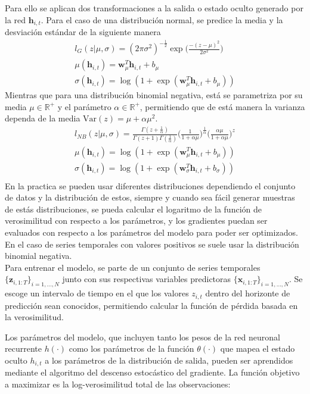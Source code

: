 \documentclass[12pt,letterpaper]{article}
\begin{document}
Para ello se aplican dos transformaciones a la salida o estado oculto generado por la red $\textbf{h}_{i,t}$. Para el caso de una distribución normal, se predice la media y la desviación estándar de la siguiente manera
\begin{gather}
    l_G(z|\mu, \sigma) = (2\pi \sigma^2)^{-\frac{1}{2}}\exp\bigg(\frac{-(z-\mu)^2}{2\sigma^2}\bigg)\\
    \mu( \textbf{h}_{i,t})= \textbf{w}_\mu^T\textbf{h}_{i,t}+b_\mu\\
    \sigma( \textbf{h}_{i,t})=\log(1+\exp(\textbf{w}_\mu^T\textbf{h}_{i,t}+b_\mu))
\end{gather}
Mientras que para una distribución binomial negativa, está se parametriza por su media $\mu\in\mathbb{R}^+$ y el parámetro $\alpha\in\mathbb{R}^+$, permitiendo que de está manera la varianza dependa de la media $\text{Var}(z)=\mu+\alpha\mu^2$.
\begin{gather}
    l_{NB}(z|\mu,\sigma) = \frac{\Gamma(z+\frac{1}{\alpha})}{\Gamma(z+1) \Gamma(\frac{1}{\alpha})} \bigg( \frac{1}{1+\alpha \mu}\bigg)^{\frac{1}{\alpha}}\bigg( \frac{\alpha \mu}{1+\alpha\mu}\bigg)^z\\
    \mu(\textbf{h}_{i,t})=\log(1+\exp(\textbf{w}_\mu^T\textbf{h}_{i,t}+b_\mu))\\
    \sigma(\textbf{h}_{i,t})=\log(1+\exp(\textbf{w}_\sigma^T\textbf{h}_{i,t}+b_\sigma))\\
\end{gather}
En la practica se pueden usar diferentes distribuciones dependiendo el conjunto de datos y la distribución de estos, siempre y cuando sea fácil generar muestras de estás distribuciones, se pueda calcular el logaritmo de la función de verosimilitud con respecto a los parámetros, y los gradientes puedan ser evaluados con respecto a los parámetros del modelo para poder ser optimizados. En el caso de series temporales con valores positivos se suele usar la distribución binomial negativa.\\

Para entrenar el modelo, se parte de un conjunto de series temporales $\{\textbf{z}_{i, 1:T}\}_{i=1,\dots,N}$ junto con sus respectivas variables predictoras $\{\textbf{x}_{i,1:T}\}_{i=1,\dots,N}$. Se escoge un intervalo de tiempo en el que los valores $z_{i,t}$ dentro del horizonte de predicción sean conocidos, permitiendo calcular la función de pérdida basada en la verosimilitud.

Los parámetros del modelo, que incluyen tanto los pesos de la red neuronal recurrente $h(\cdot)$ como los parámetros de la función $\theta(\cdot)$ que mapea el estado oculto $h_{i,t}$ a los parámetros de la distribución de salida, pueden ser aprendidos mediante el algoritmo del descenso estocástico del gradiente. La función objetivo a maximizar es la log-verosimilitud total de las observaciones:
\end{document}
